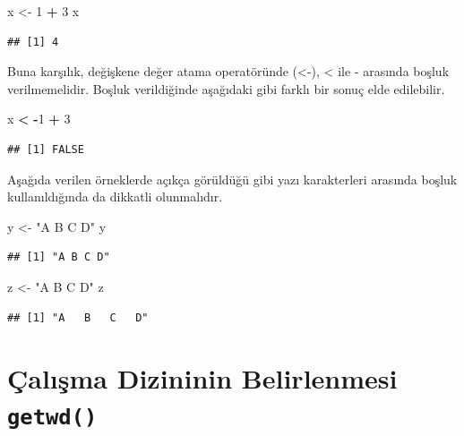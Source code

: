 \documentclass[
]{book}
\newenvironment{Shaded}{\begin{snugshade}}{\end{snugshade}}
\newcommand{\DecValTok}[1]{\textcolor[rgb]{0.00,0.00,0.81}{#1}}
\newcommand{\NormalTok}[1]{#1}
\newcommand{\OtherTok}[1]{\textcolor[rgb]{0.56,0.35,0.01}{#1}}
\newcommand{\SpecialCharTok}[1]{\textcolor[rgb]{0.81,0.36,0.00}{\textbf{#1}}}
\newcommand{\StringTok}[1]{\textcolor[rgb]{0.31,0.60,0.02}{#1}}
\begin{document}
\begin{Shaded}
\begin{Highlighting}[]
\NormalTok{x }\OtherTok{\textless{}{-}} \DecValTok{1} \SpecialCharTok{+} \DecValTok{3} 
\NormalTok{x }
\end{Highlighting}
\end{Shaded}

\begin{verbatim}
## [1] 4
\end{verbatim}

Buna karşılık, değişkene değer atama operatöründe (\textless-), \textless{} ile - arasında boşluk verilmemelidir. Boşluk verildiğinde aşağıdaki gibi farklı bir sonuç elde edilebilir.

\begin{Shaded}
\begin{Highlighting}[]
\NormalTok{x }\SpecialCharTok{\textless{}} \SpecialCharTok{{-}}\DecValTok{1} \SpecialCharTok{+} \DecValTok{3}
\end{Highlighting}
\end{Shaded}

\begin{verbatim}
## [1] FALSE
\end{verbatim}

Aşağıda verilen örneklerde açıkça görüldüğü gibi yazı karakterleri arasında boşluk kullanıldığında da dikkatli olunmalıdır.

\begin{Shaded}
\begin{Highlighting}[]
\NormalTok{y }\OtherTok{\textless{}{-}} \StringTok{"A B C D"} 
\NormalTok{y }
\end{Highlighting}
\end{Shaded}

\begin{verbatim}
## [1] "A B C D"
\end{verbatim}

\begin{Shaded}
\begin{Highlighting}[]
\NormalTok{z }\OtherTok{\textless{}{-}} \StringTok{"A   B   C   D"} 
\NormalTok{z }
\end{Highlighting}
\end{Shaded}

\begin{verbatim}
## [1] "A   B   C   D"
\end{verbatim}

\section{\texorpdfstring{Çalışma Dizininin Belirlenmesi \texttt{getwd()}}{Çalışma Dizininin Belirlenmesi getwd()}}\label{uxe7alux131ux15fma-dizininin-belirlenmesi-getwd}
\end{document}
